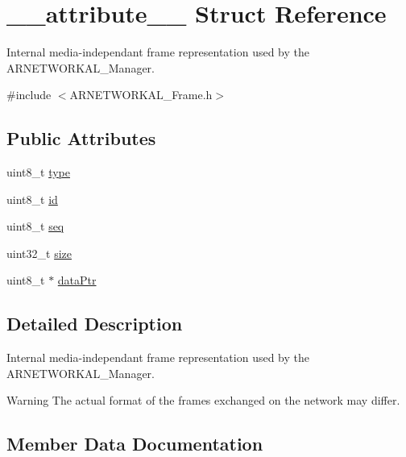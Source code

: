 \hypertarget{struct____attribute____}{}\section{\+\_\+\+\_\+attribute\+\_\+\+\_\+ Struct Reference}
\label{struct____attribute____}


Internal media-\/independant frame representation used by the A\+R\+N\+E\+T\+W\+O\+R\+K\+A\+L\+\_\+\+Manager.  




{\ttfamily \#include $<$A\+R\+N\+E\+T\+W\+O\+R\+K\+A\+L\+\_\+\+Frame.\+h$>$}

\subsection*{Public Attributes}
\begin{DoxyCompactItemize}
\item 
uint8\+\_\+t \hyperlink{struct____attribute_____a30e60959661cf2e3b2dcc52e5d3e9249}{type}
\item 
uint8\+\_\+t \hyperlink{struct____attribute_____a8ab2a4d1f9eb1727125fb5a68d3e4e71}{id}
\item 
uint8\+\_\+t \hyperlink{struct____attribute_____a198b3d0e2c50f749c71e091b5297dcbd}{seq}
\item 
uint32\+\_\+t \hyperlink{struct____attribute_____a04032b2782f3c2f600024b42bf2478f4}{size}
\item 
uint8\+\_\+t $\ast$ \hyperlink{struct____attribute_____ac9e8804fba22017607837af46597b5f1}{data\+Ptr}
\end{DoxyCompactItemize}


\subsection{Detailed Description}
Internal media-\/independant frame representation used by the A\+R\+N\+E\+T\+W\+O\+R\+K\+A\+L\+\_\+\+Manager. 

\begin{DoxyWarning}{Warning}
The actual format of the frames exchanged on the network may differ. 
\end{DoxyWarning}


\subsection{Member Data Documentation}
